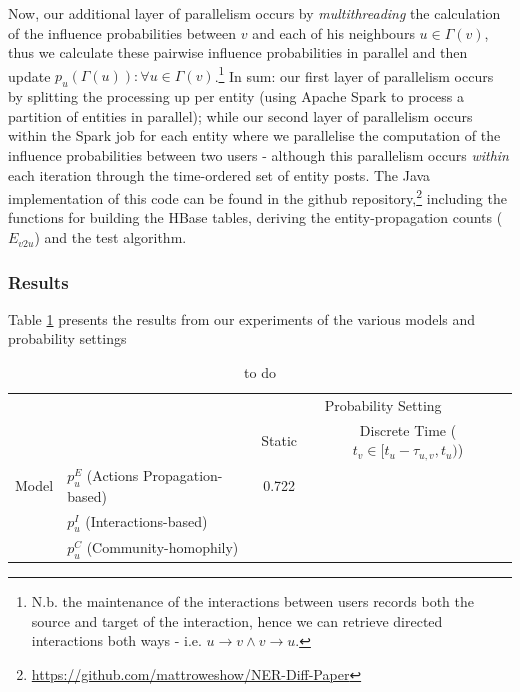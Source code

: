 \documentclass[journal,10pt,draftclsnofoot,onecolumn]{IEEEtran}
\begin{document}
Now, our additional layer of parallelism occurs by \emph{multithreading} the calculation of the influence probabilities between $v$ and each of his neighbours $u \in \Gamma(v)$, thus we calculate these pairwise influence probabilities in parallel and then update $p_u(\Gamma(u)) : \forall u \in \Gamma(v)$.\footnote{N.b. the maintenance of the interactions between users records both the source and target of the interaction, hence we can retrieve directed interactions both ways - i.e. $u \rightarrow v \wedge v \rightarrow u$.}
In sum: our first layer of parallelism occurs by splitting the processing up per entity (using Apache Spark to process a partition of entities in parallel); while our second layer of parallelism occurs within the Spark job for each entity where we parallelise the computation of the influence probabilities between two users - although this parallelism occurs \emph{within} each iteration through the time-ordered set of entity posts.
The Java implementation of this code can be found in the github repository,\footnote{\url{https://github.com/mattroweshow/NER-Diff-Paper}} including the functions for building the HBase tables, deriving the entity-propagation counts ($E_{v2u}$) and the test algorithm.

\subsubsection{Results}
Table \ref{tab:macro_results} presents the results from our experiments of the various models and probability settings


\begin{table}
\begin{center}
\caption{to do}
\begin{tabular}{l l c c}
\hline
& & \multicolumn{2}{c}{Probability Setting} \\
& & Static & Discrete Time ($t_v \in [t_u - \tau_{u,v}, t_u)$) \\
\hline
Model & $p_{u}^{E}$ (Actions Propagation-based) & 0.722 & \\
& $p_{u}^{I}$ (Interactions-based) & & \\
& $p_{u}^{C}$ (Community-homophily) & & \\
\hline
\end{tabular}
\label{tab:macro_results}
\end{center}
\end{table}
\end{document}
